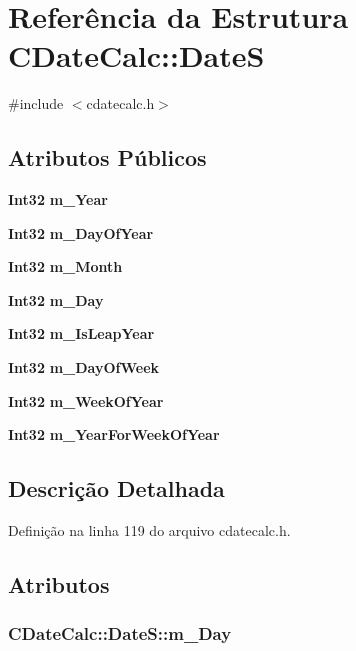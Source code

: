 \section{Referência da Estrutura C\+Date\+Calc\+:\+:DateS}
\label{struct_c_date_calc_1_1_date_s}


{\ttfamily \#include $<$cdatecalc.\+h$>$}

\subsection*{Atributos Públicos}
\begin{DoxyCompactItemize}
\item 
{\bf Int32} {\bf m\+\_\+\+Year}
\item 
{\bf Int32} {\bf m\+\_\+\+Day\+Of\+Year}
\item 
{\bf Int32} {\bf m\+\_\+\+Month}
\item 
{\bf Int32} {\bf m\+\_\+\+Day}
\item 
{\bf Int32} {\bf m\+\_\+\+Is\+Leap\+Year}
\item 
{\bf Int32} {\bf m\+\_\+\+Day\+Of\+Week}
\item 
{\bf Int32} {\bf m\+\_\+\+Week\+Of\+Year}
\item 
{\bf Int32} {\bf m\+\_\+\+Year\+For\+Week\+Of\+Year}
\end{DoxyCompactItemize}


\subsection{Descrição Detalhada}


Definição na linha 119 do arquivo cdatecalc.\+h.



\subsection{Atributos}
\subsubsection[{m\+\_\+\+Day}]{ C\+Date\+Calc\+::\+Date\+S\+::m\+\_\+\+Day}\label{struct_c_date_calc_1_1_date_s_a3da3e173c50b861c316ff3dcb33eaa70}


